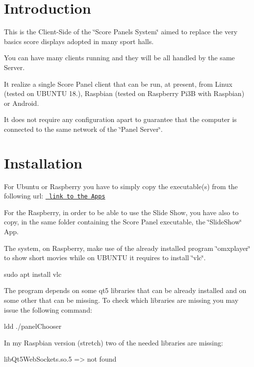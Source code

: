 \hypertarget{index_intro}{}\section{Introduction}\label{index_intro}
This is the Client-\/Side of the \char`\"{}\+Score Panels System\char`\"{} aimed to replace the very basics score displays adopted in many sport halls.

You can have many clients running and they will be all handled by the same Server.

It realize a single Score Panel client that can be run, at present, from Linux (tested on U\+B\+U\+N\+TU 18.), Raspbian (tested on Raspberry Pi3B with Raspbian) or Android.

It does not require any configuration apart to guarantee that the computer is connected to the same network of the \char`\"{}\+Panel Server\char`\"{}.\hypertarget{index_install}{}\section{Installation}\label{index_install}
For Ubuntu or Raspberry you have to simply copy the executable(s) from the following url\+: \href{https://github.com/salvato/ScorePanel_Executables}\texttt{ link to the Apps}

For the Raspberry, in order to be able to use the Slide Show, you have also to copy, in the same folder containing the Score Panel executable, the \char`\"{}\+Slide\+Show\char`\"{} App.

The system, on Raspberry, make use of the already installed program \char`\"{}omxplayer\char`\"{} to show short movies while on U\+B\+U\+N\+TU it requires to install \char`\"{}vlc\char`\"{}.


\begin{DoxyPre}sudo apt install vlc\end{DoxyPre}


The program depends on some qt5 libraries that can be already installed and on some other that can be missing. To check which libraries are missing you may issue the following command\+:


\begin{DoxyPre}ldd ./panelChooser\end{DoxyPre}


In my Raspbian version (stretch) two of the needed libraries are missing\+:


\begin{DoxyPre}libQt5WebSockets.so.5 => not found\end{DoxyPre}



